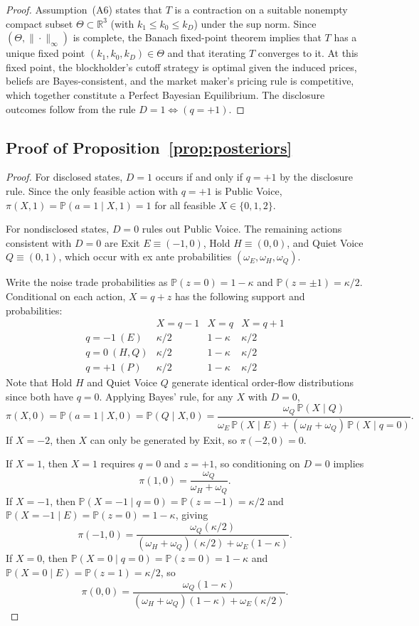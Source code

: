 \documentclass[11pt]{article}
\newcommand{\PP}{\mathbb{P}}
\newcommand{\1}{\mathbf{1}}
\newcommand{\R}{\mathbb{R}}
\begin{document}
\begin{proof}
Assumption~\textup{(A6)} states that $T$ is a contraction on a suitable nonempty compact subset $\Theta\subset\R^3$ (with $k_1\le k_0\le k_D$) under the sup norm. Since $(\Theta,\|\cdot\|_\infty)$ is complete, the Banach fixed-point theorem implies that $T$ has a unique fixed point $(k_1,k_0,k_D)\in\Theta$ and that iterating $T$ converges to it. At this fixed point, the blockholder's cutoff strategy is optimal given the induced prices, beliefs are Bayes-consistent, and the market maker's pricing rule is competitive, which together constitute a Perfect Bayesian Equilibrium. The disclosure outcomes follow from the rule $D=1\iff(q=+1)$.
\end{proof}

\subsection{Proof of Proposition~\ref{prop:posteriors}}
\label{app:proof-posteriors}

\begin{proof}
For disclosed states, $D=1$ occurs if and only if $q=+1$ by the disclosure rule. Since the only feasible action with $q=+1$ is Public Voice, $\pi(X,1)=\PP(a=1 \mid X,1)=1$ for all feasible $X\in\{0,1,2\}$.

For nondisclosed states, $D=0$ rules out Public Voice. The remaining actions consistent with $D=0$ are Exit $E\equiv(-1,0)$, Hold $H\equiv(0,0)$, and Quiet Voice $Q\equiv(0,1)$, which occur with ex ante probabilities $(\omega_E,\omega_H,\omega_Q)$.

Write the noise trade probabilities as $\PP(z=0)=1-\kappa$ and $\PP(z=\pm1)=\kappa/2$. Conditional on each action, $X=q+z$ has the following support and probabilities:
\[
\begin{array}{c|ccc}
 & X=q-1 & X=q & X=q+1 \\ \hline
q=-1~(E) & \kappa/2 & 1-\kappa & \kappa/2 \\
q=0~(H,Q)  & \kappa/2 & 1-\kappa & \kappa/2 \\
q=+1~(P) & \kappa/2 & 1-\kappa & \kappa/2
\end{array}
\]
Note that Hold $H$ and Quiet Voice $Q$ generate identical order-flow distributions since both have $q=0$. Applying Bayes' rule, for any $X$ with $D=0$,
\[
\pi(X,0)=\PP(a=1 \mid X,0)=\PP(Q \mid X,0)=\frac{\omega_Q\,\PP(X \mid Q)}{\omega_E\,\PP(X \mid E)+(\omega_H+\omega_Q)\,\PP(X \mid q\!=\!0)}.
\]
If $X=-2$, then $X$ can only be generated by Exit, so $\pi(-2,0)=0$.

If $X=1$, then $X=1$ requires $q=0$ and $z=+1$, so conditioning on $D=0$ implies
\[
\pi(1,0)=\frac{\omega_Q}{\omega_H+\omega_Q}.
\]
If $X=-1$, then $\PP(X=-1 \mid q\!=\!0)=\PP(z=-1)=\kappa/2$ and $\PP(X=-1 \mid E)=\PP(z=0)=1-\kappa$, giving
\[
\pi(-1,0)=\frac{\omega_Q(\kappa/2)}{(\omega_H+\omega_Q)(\kappa/2)+\omega_E(1-\kappa)}.
\]
If $X=0$, then $\PP(X=0 \mid q\!=\!0)=\PP(z=0)=1-\kappa$ and $\PP(X=0 \mid E)=\PP(z=1)=\kappa/2$, so
\[
\pi(0,0)=\frac{\omega_Q(1-\kappa)}{(\omega_H+\omega_Q)(1-\kappa)+\omega_E(\kappa/2)}.
\]
\end{proof}
\end{document}
